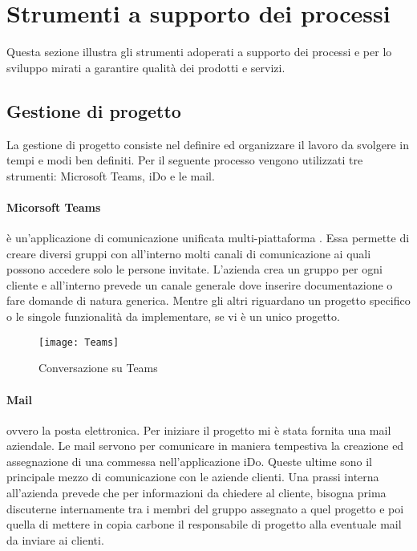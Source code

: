 \section{Strumenti a supporto dei processi}
\label{cap1:Strumenti a supporto dei processi}
Questa sezione illustra gli strumenti adoperati a supporto dei processi e per lo sviluppo mirati a garantire qualità dei prodotti e servizi.

\subsection{Gestione di progetto}
\label{cap1:Gestione di progetto}

La gestione di progetto consiste nel definire ed organizzare il lavoro da svolgere in tempi e modi ben definiti. Per il seguente processo vengono utilizzati tre strumenti: Microsoft Teams, iDo e le mail.

\paragraph{Micorsoft Teams} è un'applicazione di comunicazione unificata multi-piattaforma . Essa permette di creare diversi gruppi con all'interno molti canali di comunicazione ai quali possono accedere solo le persone invitate. L'azienda crea un gruppo per ogni cliente e all'interno prevede un canale generale dove inserire documentazione o fare domande di natura generica. Mentre gli altri riguardano un progetto specifico o le singole funzionalità da implementare, se vi è un unico progetto. 

\begin{figure}[!h] 
	\centering 
	\texttt{[image: Teams]} 
	\caption{Conversazione su Teams}
\end{figure}


\paragraph{Mail} ovvero la posta elettronica. Per iniziare il progetto mi è stata fornita una mail aziendale. Le mail servono per comunicare in maniera tempestiva la creazione ed assegnazione di una commessa nell'applicazione iDo. Queste ultime sono il principale mezzo di comunicazione con le aziende clienti. Una prassi interna all'azienda prevede che per informazioni da chiedere al cliente, bisogna prima discuterne internamente tra i membri del gruppo assegnato a quel progetto e poi quella di mettere in copia carbone il responsabile di progetto alla eventuale mail da inviare ai clienti.



